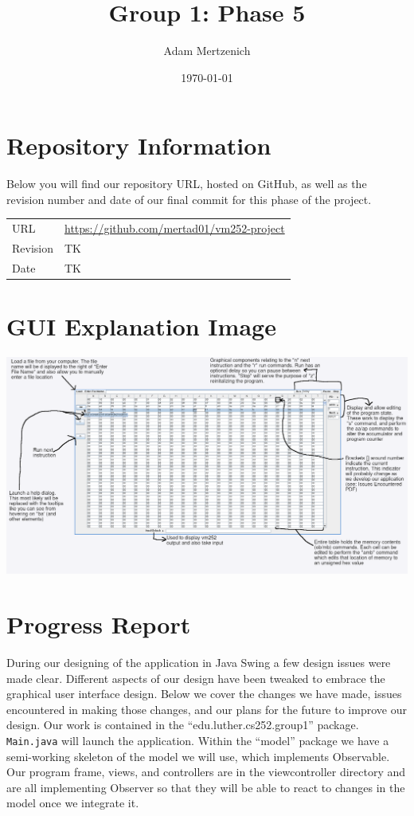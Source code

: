 \documentclass[11pt]{article}
\author{Adam Mertzenich}
\date{\today}
\title{Group 1: Phase 5}
\begin{document}
\maketitle
\tableofcontents


\section{Repository Information}
\label{sec:org5227a2e}

Below you will find our repository URL, hosted on GitHub, as well as the revision number and date of our final commit for this phase of the project.

\begin{center}
\begin{tabular}{ll}
URL & \url{https://github.com/mertad01/vm252-project}\\
Revision & TK\\
Date & TK\\
\end{tabular}
\end{center}

\section{GUI Explanation Image}
\label{sec:orgaca61c9}

\begin{center}
\includegraphics[width=.9\linewidth]{./annotated-screenshot.png}
\end{center}

\section{Progress Report}
\label{sec:orgfc4744a}

During our designing of the application in Java Swing a few design issues were made clear. Different aspects of our design have been tweaked to embrace the graphical user interface design. Below we cover the changes we have made, issues encountered in making those changes, and our plans for the future to improve our design. Our work is contained in the ``edu.luther.cs252.group1'' package. \texttt{Main.java} will launch the application. Within the ``model'' package we have a semi-working skeleton of the model we will use, which implements Observable. Our program frame, views, and controllers are in the viewcontroller directory and are all implementing Observer so that they will be able to react to changes in the model once we integrate it.
\end{document}
